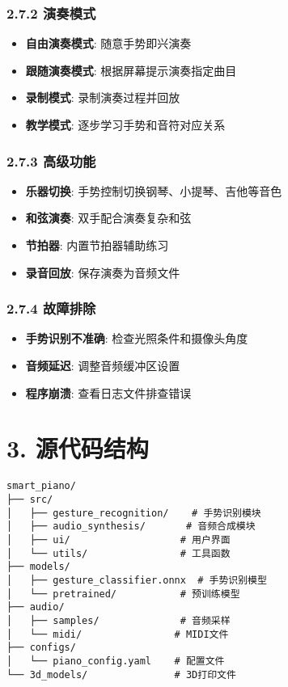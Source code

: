 \subsubsection{2.7.2 演奏模式}\label{ux6f14ux594fux6a21ux5f0f}

\begin{itemize}
\tightlist
\item
  \textbf{自由演奏模式}: 随意手势即兴演奏
\item
  \textbf{跟随演奏模式}: 根据屏幕提示演奏指定曲目
\item
  \textbf{录制模式}: 录制演奏过程并回放
\item
  \textbf{教学模式}: 逐步学习手势和音符对应关系
\end{itemize}

\subsubsection{2.7.3 高级功能}\label{ux9ad8ux7ea7ux529fux80fd}

\begin{itemize}
\tightlist
\item
  \textbf{乐器切换}: 手势控制切换钢琴、小提琴、吉他等音色
\item
  \textbf{和弦演奏}: 双手配合演奏复杂和弦
\item
  \textbf{节拍器}: 内置节拍器辅助练习
\item
  \textbf{录音回放}: 保存演奏为音频文件
\end{itemize}

\subsubsection{2.7.4 故障排除}\label{ux6545ux969cux6392ux9664}

\begin{itemize}
\tightlist
\item
  \textbf{手势识别不准确}: 检查光照条件和摄像头角度
\item
  \textbf{音频延迟}: 调整音频缓冲区设置
\item
  \textbf{程序崩溃}: 查看日志文件排查错误
\end{itemize}

\section{3. 源代码结构}\label{ux6e90ux4ee3ux7801ux7ed3ux6784}

\begin{lstlisting}
smart_piano/
├── src/
│   ├── gesture_recognition/    # 手势识别模块
│   ├── audio_synthesis/       # 音频合成模块
│   ├── ui/                   # 用户界面
│   └── utils/                # 工具函数
├── models/
│   ├── gesture_classifier.onnx  # 手势识别模型
│   └── pretrained/           # 预训练模型
├── audio/
│   ├── samples/              # 音频采样
│   └── midi/                # MIDI文件
├── configs/
│   └── piano_config.yaml    # 配置文件
└── 3d_models/               # 3D打印文件
\end{lstlisting}

